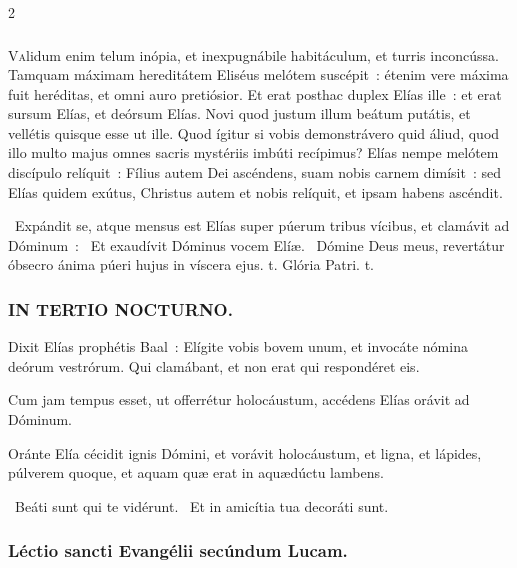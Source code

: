 \documentclass[9pt,twoside]{extarticle}
\begin{document}
\begin{multicols}{2}
{{{\subsubsection*{\center {}}
\lettrine{V}alidum enim telum inópia, et inexpugnábile habitáculum, et turris inconcússa. Tamquam máximam hereditátem Eliséus melótem suscépit~: étenim vere máxima fuit heréditas, et omni auro pretiósior. Et erat posthac duplex Elías ille~: et erat sursum Elías, et deórsum Elías. Novi quod justum illum beátum putátis, et vellétis quisque esse ut ille. Quod ígitur si vobis demonstrávero quid áliud, quod illo multo majus omnes sacris mystériis imbúti recípimus? Elías nempe melótem discípulo relíquit~: Fílius autem Dei ascéndens, suam nobis carnem dimísit~: sed Elías quidem exútus, Christus autem et nobis relíquit, et ipsam habens ascéndit.

\begin{tightlist}{}
\item {}~Expándit se, atque mensus est Elías super púerum tribus vícibus, et clamávit ad Dóminum~: \textred{*}~Et exaudívit Dóminus vocem Elíæ. ~Dómine Deus meus, revertátur óbsecro ánima púeri hujus in víscera ejus. t. Glória Patri. t.
\end{tightlist}

\subsubsection*{\center \textsc{IN TERTIO NOCTURNO.}}
\begin{tightlist}{}
\item {} Dixit Elías prophétis Baal~: Elígite vobis bovem unum, et invocáte nómina deórum vestrórum. Qui clamábant, et non erat qui respondéret eis.
\item {} Cum jam tempus esset, ut offerrétur holocáustum, accédens Elías orávit ad Dóminum.
\item {} Oránte Elía cécidit ignis Dómini, et vorávit holocáustum, et ligna, et lápides, púlverem quoque, et aquam quæ erat in aquædúctu lambens.
\item {}~Beáti sunt qui te vidérunt. ~Et in amicítia tua decoráti sunt.
\end{tightlist}

\subsubsection*{\center Léctio sancti Evangélii secúndum Lucam.}
}}}
\end{multicols}
\end{document}
